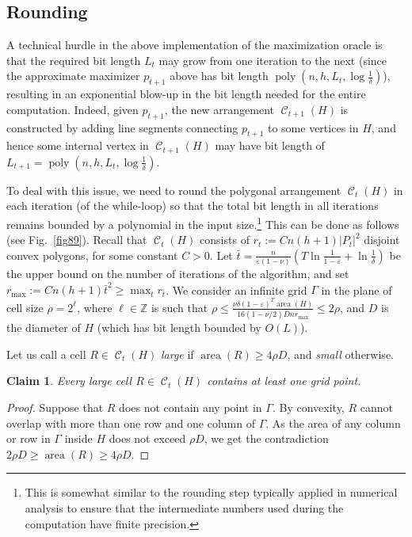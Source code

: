 \documentclass[a4paper,11pt]{article}
\newtheorem{claim}[theorem]{Claim}
\def\ZZ{\mathbb Z}
\def\cC{\mathcal C}
\def\eps{\varepsilon}
\newcommand{\poly}{\operatorname{poly}}
\newcommand{\area}{\operatorname{area}}
\newcommand{\cells}{\operatorname{\cC}}
\begin{document}
\subsection{Rounding}
A technical hurdle in the above implementation of the maximization oracle is that the required bit length $L_t$ may grow from one iteration to the next (since the approximate maximizer $p_{t+1}$ above has bit length $\poly(n,h,L_t,\log\frac{1}{\delta})$), resulting in an exponential blow-up in the bit length needed for the entire computation. Indeed, given $p_{t+1}$, the new arrangement $\cells_{t+1}(H)$ is constructed by adding line segments connecting $p_{t+1}$ to some vertices in $H$, and hence some internal vertex in $\cells_{t+1}(H)$ may have bit length of $L_{t+1}=\poly(n,h,L_t,\log\frac{1}{\delta})$.

To deal with this issue, we need to round the polygonal arrangement $\cells_t(H)$ in each iteration (of the while-loop) so that the total bit length in all iterations remains bounded by a polynomial in the input size.\footnote{This is somewhat similar to the rounding step typically applied in numerical analysis to ensure that the intermediate numbers used during the  computation have finite precision.} This can be done as follows (see Fig.~\ref{fig89}). Recall that $\cells_t(H)$ consists of $r_t:=Cn(h+1)|P_t|^2$ disjoint convex polygons, for some constant $C>0$. Let $\bar t=\frac{n}{\eps(1-\nu)}\left(T\ln\frac{1}{1-\eps}+\ln\frac{1}{\delta}\right)$ be the upper bound on the number of iterations of the algorithm, and set 
$r_{\max}:= Cn(h+1)\bar t^2\ge \max_tr_t$. We consider an infinite grid $\Gamma$ in the plane of cell size $\rho=2^\ell$, where $\ell\in\ZZ$ is such that $\rho\le\frac{\nu\delta(1-\varepsilon)^T\area(H)}{16(1-\nu/2) D n r_{\max}}\le 2\rho$, and $D$ is the diameter of $H$ (which has bit length bounded by $O(L)$).

Let us call a cell $R\in\cells_t(H)$ {\it large} if $\area(R)\ge4\rho D$, and {\it small} otherwise. 
\begin{claim}\label{cl5}
	Every large cell  $R\in\cells_t(H)$ contains at least one grid point.
\end{claim}
\begin{proof}
Suppose that $R$ does not contain any point in $\Gamma$. 
By convexity, $R$ cannot overlap with more than one row and one column of $\Gamma$. As the area of any column or row in  $\Gamma$ inside $H$ does not exceed $\rho D$, we get the contradiction
$
2\rho D\ge \area(R)\ge 4\rho D.
$
\end{proof}
\end{document}
